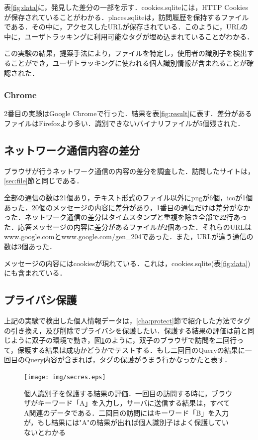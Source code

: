 \documentclass[submit]{ipsj}
\begin{document}
表\ref{fig:data}に，発見した差分の一部を示す．cookies.sqliteには，HTTP Cookiesが保存されていることがわかる．places.sqliteは，訪問履歴を保持するファイルである．その中に，アクセスしたURLが保存されている．このように，URLの中に，ユーザトラッキングに利用可能なタグが埋め込まれていることがわかる．

この実験の結果，提案手法により，ファイルを特定し，使用者の識別子を検出することができ，ユーザトラッキングに使われる個人識別情報が含まれることが確認された．

\subsubsection{Chrome}

2番目の実験はGoogle Chromeで行った．結果を表\ref{fig:result}に表す．差分があるファイルはFirefoxより多い．識別できないバイナリファイルが5個残された．

\label{sec:one}
\subsection{ネットワーク通信内容の差分}
ブラウザが行うネットワーク通信の内容の差分を調査した．訪問したサイトは，\ref{sec:file}節と同じである．

全部の通信の数は21個あり，テキスト形式のファイル以外にpngが6個，icoが1個あった．20個のメッセージの内容に差分があり，1番目の通信だけは差分がなかった．ネットワーク通信の差分はタイムスタンプと重複を除き全部で22行あった．応答メッセージの内容に差分があるファイルが2個あった．それらのURLはwww.google.comとwww.google.com/gen\_204であった．また，URLが違う通信の数は3個あった．

メッセージの内容にはcookiesが現れている．これは，cookies.sqlite(表\ref{fig:data})にも含まれている．



\subsection{プライバシ保護}

上記の実験で検出した個人情報データは，\ref{cha:protect}節で紹介した方法でタグの引き換え，及び削除でプライバシを保護したい．保護する結果の評価は前と同じように双子の環境で動き，図\ref{figure:secres}のように，双子のブラウザで訪問を二回行って，保護する結果は成功かどうかでテストする．もし二回目のQueryの結果に一回目のQuery内容が含まれば，タグの保護がうまう行かなっかたと表す．


\begin{figure}[ht]
\begin{center}
\texttt{[image: img/secres.eps]}
\caption{個人識別子を保護する結果の評価．一回目の訪問する時に，ブラウザがキーワード「A」を入力し，サーバに送信する結果は，すべてA関連のデータである．二回目の訪問にはキーワード「B」を入力が，もし結果には"A"の結果が出れば個人識別子はよく保護していないとわかる}
\label{figure:secres}
\end{center}
\end{figure}
\end{document}
